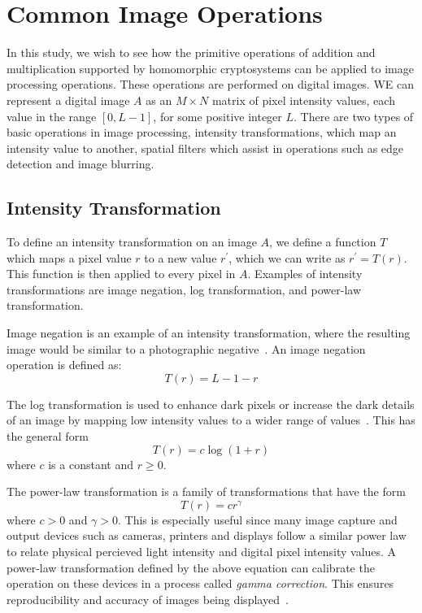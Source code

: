 \section{Common Image Operations}
In this study, we wish to see how the primitive operations of addition and multiplication supported by homomorphic cryptosystems can be applied to image processing operations. These operations are performed on digital images. WE can represent a digital image $A$ as an $M \times N$ matrix of pixel intensity values, each value in the range $\left[0, L-1\right]$, for some positive integer $L$. There are two types of basic operations in image processing, intensity transformations, which map an intensity value to another, spatial filters which assist in operations such as edge detection and image blurring.

\subsection{Intensity Transformation}
To define an intensity transformation on an image $A$, we define a function $T$ which maps a pixel value $r$ to a new value $r^\prime$, which we can write as $r^\prime = T\left(r\right)$. This function is then applied to every pixel in $A$. Examples of intensity transformations are image negation, log transformation, and power-law transformation.

Image negation is an example of an intensity transformation, where the resulting image would be similar to a photographic negative~\cite{gonzalez_digital_2008}. An image negation operation is defined as:
\begin{equation}
    T\left(r\right) = L-1-r
\end{equation}

The log transformation is used to enhance dark pixels or increase the dark details of an image by mapping low intensity values to a wider range of values~\cite{gonzalez_digital_2008}. This has the general form
\begin{equation}
    T\left(r\right) = c \log\left(1 + r\right)
\end{equation}
where $c$ is a constant and $r \ge 0$.

The power-law transformation is a family of transformations that have the form
\begin{equation}
    T\left(r\right) = c r^{\gamma}
\end{equation}
where $c>0$ and $\gamma > 0$. This is especially useful since many image capture and output devices such as cameras, printers and displays follow a similar power law to relate physical percieved light intensity and digital pixel intensity values. A power-law transformation defined by the above equation can calibrate the operation on these devices in a process called \textit{gamma correction}. This ensures reproducibility and accuracy of images being displayed~\cite{gonzalez_digital_2008}.

